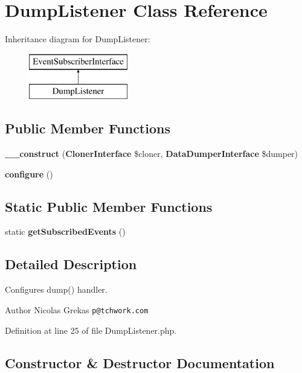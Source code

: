 \section{Dump\+Listener Class Reference}
\label{class_symfony_1_1_component_1_1_http_kernel_1_1_event_listener_1_1_dump_listener}
Inheritance diagram for Dump\+Listener\+:\begin{figure}[H]
\begin{center}
\leavevmode
\includegraphics[height=2.000000cm]{class_symfony_1_1_component_1_1_http_kernel_1_1_event_listener_1_1_dump_listener}
\end{center}
\end{figure}
\subsection*{Public Member Functions}
\begin{DoxyCompactItemize}
\item 
{\bf \+\_\+\+\_\+construct} ({\bf Cloner\+Interface} \$cloner, {\bf Data\+Dumper\+Interface} \$dumper)
\item 
{\bf configure} ()
\end{DoxyCompactItemize}
\subsection*{Static Public Member Functions}
\begin{DoxyCompactItemize}
\item 
static {\bf get\+Subscribed\+Events} ()
\end{DoxyCompactItemize}


\subsection{Detailed Description}
Configures dump() handler.

\begin{DoxyAuthor}{Author}
Nicolas Grekas {\tt p@tchwork.\+com} 
\end{DoxyAuthor}


Definition at line 25 of file Dump\+Listener.\+php.



\subsection{Constructor \& Destructor Documentation}
